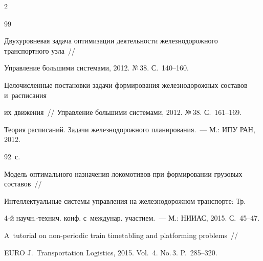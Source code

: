 \begin{multicols}{2}
{{\begin{thebibliography}{99}




Двухуровневая задача оптимизации деятельности железнодорожного транспортного узла~// 


Управление большими сис\-те\-ма\-ми, 2012. №\,38. С.~140--160.









Целочисленные постановки задачи формирования железнодорожных составов и~расписания 


их движения~// Управление большими системами, 2012. №\,38. С.~161--169.









Теория расписаний. Задачи железнодорожного планирования.~--- М.: ИПУ РАН, 2012.


92~с.









Модель оптимального назначения локомотивов при формировании грузовых составов~// 


Интеллектуальные системы управления на железнодорожном транспорте: Тр. 


4-й научн.-технич. конф. с~междунар. учас\-ти\-ем.~--- М.: НИИАС, 2015. С.~45--47.









A~tutorial on non-periodic train timetabling and platforming problems~// 


EURO J.~Transportation Logistics, 2015. Vol.~4. No.\,3. P.~285--320.










\end{thebibliography}}}
\end{multicols}
